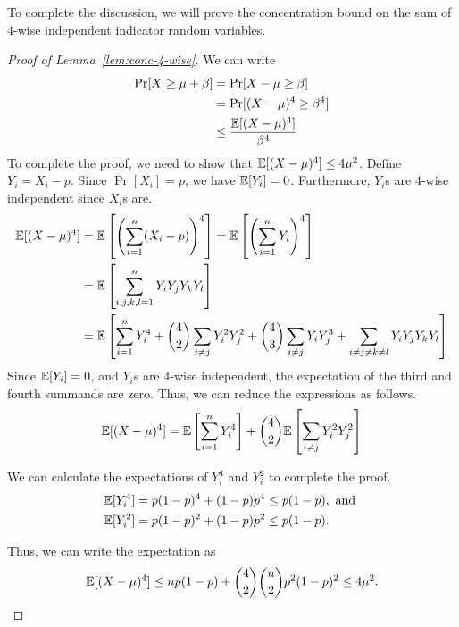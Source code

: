 To complete the discussion, we will prove the concentration bound on the sum of
$4$-wise independent indicator random variables.

\begin{proof}
  [Proof of Lemma~\ref{lem:conc-4-wise}]
  We can write
  \begin{align*}
    \Pr[X \geq \mu + \beta] &= \Pr[X - \mu \geq \beta] \\
                            &= \Pr[(X-\mu)^4 \geq \beta^4]\\
                            &\leq \frac{\mathbb{E}[(X-\mu)^4]}{\beta^4}
  \end{align*}
  To complete the proof, we need to show that $\mathbb{E}[(X-\mu)^4] \leq
  4\mu^2$. Define $Y_i = X_i - p$. Since $\Pr[X_i] = p$, we have $\mathbb{E}[Y_i] =
  0$. Furthermore, $Y_i$s are $4$-wise independent since $X_i$s are.
  \begin{align*}
    \mathbb{E}[(X-\mu)^4] &= \mathbb{E}\left[ \left( \sum_{i=1}^n (X_i - p) \right)^4  \right] = \mathbb{E}\left[ \left( \sum_{i=1}^n Y_i \right)^4 \right]\\
                  &= \mathbb{E} \left[ \sum_{i,j,k,l = 1}^n Y_iY_jY_kY_l \right]\\
                  &= \mathbb{E}\left[ \sum_{i=1}^n Y_i^4 +  \binom{4}{2}\sum_{i\neq j}Y_i^2Y_j^2 + \binom{4}{3}\sum_{i\neq j}Y_iY_j^3 + \sum_{i\neq j\neq k\neq l}Y_iY_jY_kY_l \right]
  \end{align*}
  Since $\mathbb{E}[Y_i] = 0$, and $Y_i$s are $4$-wise independent, the expectation of
  the third and fourth summands are zero. Thus, we can reduce the expressions as
  follows.
  \begin{align*}
    \mathbb{E}[(X-\mu)^4] = \mathbb{E}\left[ \sum_{i=1}^n Y_i^4 \right] + \binom{4}{2}\mathbb{E}\left[ \sum_{i\neq j}Y_i^2 Y_j^2 \right]
  \end{align*}

  We can calculate the expectations of $Y_i^4$ and $Y_i^2$ to complete the proof.
  \begin{align*}
    \mathbb{E}[Y_i^4] &= p(1-p)^4 + (1-p)p^4 \leq p(1-p), \text{ and }\\
    \mathbb{E}[Y_i^2] &= p(1-p)^2 + (1-p)p^2 \leq p(1-p).
  \end{align*}

  Thus, we can write the expectation as
  \begin{align*}
    \mathbb{E}[(X-\mu)^4] \leq np(1-p) + \binom{4}{2}\binom{n}{2}p^2(1-p)^2 \leq 4\mu^2.
  \end{align*}
\end{proof}


